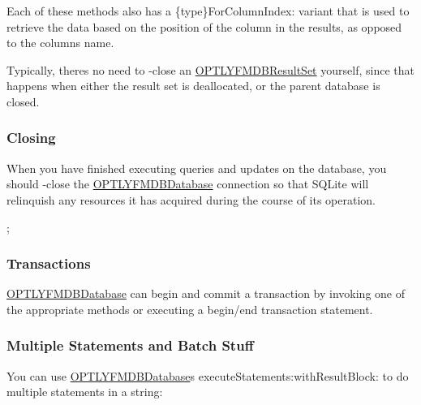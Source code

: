 Each of these methods also has a {\ttfamily \{type\}For\+Column\+Index\+:} variant that is used to retrieve the data based on the position of the column in the results, as opposed to the column\textquotesingle{}s name.

Typically, there\textquotesingle{}s no need to {\ttfamily -\/close} an {\ttfamily \mbox{\hyperlink{interface_o_p_t_l_y_f_m_d_b_result_set}{O\+P\+T\+L\+Y\+F\+M\+D\+B\+Result\+Set}}} yourself, since that happens when either the result set is deallocated, or the parent database is closed.

\subsubsection*{Closing}

When you have finished executing queries and updates on the database, you should {\ttfamily -\/close} the {\ttfamily \mbox{\hyperlink{interface_o_p_t_l_y_f_m_d_b_database}{O\+P\+T\+L\+Y\+F\+M\+D\+B\+Database}}} connection so that S\+Q\+Lite will relinquish any resources it has acquired during the course of its operation.


\begin{DoxyCode}
[db close];
\end{DoxyCode}


\subsubsection*{Transactions}

{\ttfamily \mbox{\hyperlink{interface_o_p_t_l_y_f_m_d_b_database}{O\+P\+T\+L\+Y\+F\+M\+D\+B\+Database}}} can begin and commit a transaction by invoking one of the appropriate methods or executing a begin/end transaction statement.

\subsubsection*{Multiple Statements and Batch Stuff}

You can use {\ttfamily \mbox{\hyperlink{interface_o_p_t_l_y_f_m_d_b_database}{O\+P\+T\+L\+Y\+F\+M\+D\+B\+Database}}}\textquotesingle{}s execute\+Statements\+:with\+Result\+Block\+: to do multiple statements in a string\+:


